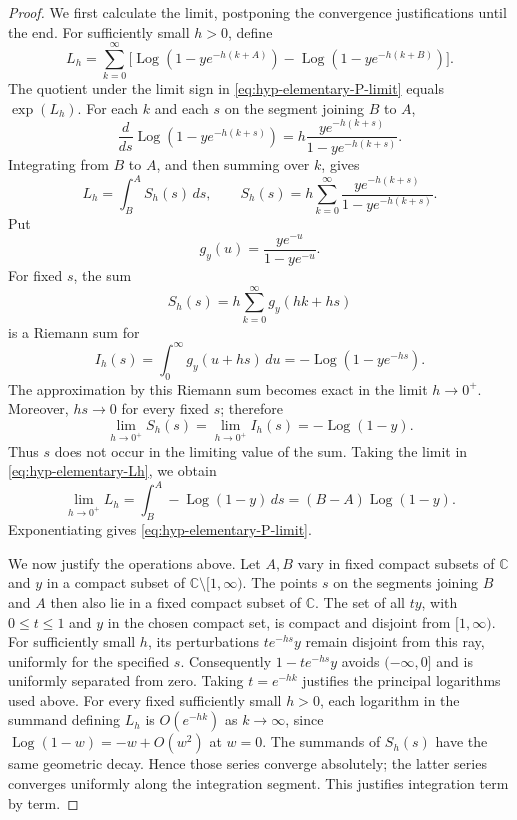 \documentclass[12pt]{amsart}
\theoremstyle{definition}
\numberwithin{equation}{section}
\theoremstyle{definition}
\let\le\leqslant
\def\C{{\mathbb C}}
\def\beq{\begin{equation}}
\def\eeq{\end{equation}}
\begin{document}
\begin{proof}
We first calculate the limit, postponing the convergence
justifications until the end.
For sufficiently small $h>0$, define
\[
 L_h=\sum_{k=0}^\infty\bigl[
 \operatorname{Log}(1-ye^{-h(k+A)})
 -\operatorname{Log}(1-ye^{-h(k+B)})\bigr].
\]
The quotient under the limit sign in
\eqref{eq:hyp-elementary-P-limit} equals $\exp(L_h)$. For each
$k$ and each $s$ on the segment
joining $B$ to $A$,
\[
 \frac{d}{ds}\operatorname{Log}(1-ye^{-h(k+s)})
 =h\frac{ye^{-h(k+s)}}{1-ye^{-h(k+s)}}.
\]
Integrating from $B$ to $A$, and then summing over $k$, gives
\beq\label{eq:hyp-elementary-Lh}
 L_h=\int_B^A S_h(s)\,ds,
 \qquad
 S_h(s)=h\sum_{k=0}^\infty
 \frac{ye^{-h(k+s)}}{1-ye^{-h(k+s)}}.
\eeq
Put
\[
 g_y(u)=\frac{ye^{-u}}{1-ye^{-u}}.
\]
For fixed $s$, the sum
\[
 S_h(s)=h\sum_{k=0}^\infty g_y(hk+hs)
\]
is a Riemann sum for
\[
 I_h(s)=\int_0^\infty g_y(u+hs)\,du
       =-\operatorname{Log}(1-ye^{-hs}).
\]
The approximation by this Riemann sum becomes exact in the
limit $h\to0^+$.  Moreover, $hs\to0$ for every fixed $s$;
therefore
\beq\label{eq:hyp-elementary-Sh}
 \lim_{h\to0^+}S_h(s)
 =\lim_{h\to0^+}I_h(s)
 =-\operatorname{Log}(1-y).
\eeq
Thus $s$ does not occur in the limiting value of the sum.
Taking the limit in \eqref{eq:hyp-elementary-Lh}, we obtain
\[
 \lim_{h\to0^+}L_h
 =\int_B^A-\operatorname{Log}(1-y)\,ds
 =(B-A)\operatorname{Log}(1-y).
\]
Exponentiating gives \eqref{eq:hyp-elementary-P-limit}.

We now justify the operations above.  Let $A,B$ vary in fixed
compact subsets of $\C$ and $y$ in a compact subset of
$\C\setminus[1,\infty)$.  The points $s$ on the segments
joining $B$ and $A$ then also lie in a fixed compact subset
of $\C$. The set of all $ty$, with $0\le t\le1$ and $y$
in the chosen compact set, is compact and disjoint from
$[1,\infty)$. For sufficiently small $h$, its perturbations
$te^{-hs}y$ remain disjoint from this ray, uniformly for the
specified $s$. Consequently $1-te^{-hs}y$ avoids
$(-\infty,0]$ and is uniformly separated from zero. Taking
$t=e^{-hk}$ justifies the principal logarithms used above.
For every fixed sufficiently small $h>0$, each logarithm in
the summand defining $L_h$ is $O(e^{-hk})$ as $k\to\infty$,
since $\operatorname{Log}(1-w)=-w+O(w^2)$ at $w=0$.
The summands of $S_h(s)$ have the same geometric decay. Hence those series
converge absolutely; the latter series converges uniformly
along the integration segment.  This justifies integration
term by term.


\end{proof}
\end{document}
